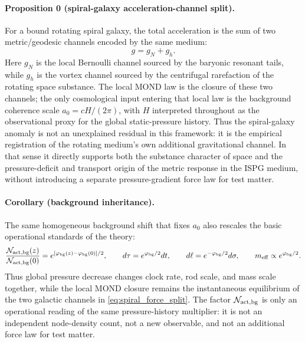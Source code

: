 \documentclass[11pt]{article}
\begin{document}
\paragraph{Proposition 0 (spiral-galaxy acceleration-channel split).}
For a bound rotating spiral galaxy, the total acceleration is the sum of
two metric/geodesic channels encoded by the same medium:
\begin{equation}
  g = g_N + g_h.
  \label{eq:spiral_force_split}
\end{equation}
Here $g_N$ is the local Bernoulli channel sourced by the baryonic
resonant tails, while $g_h$ is the vortex channel sourced by the
centrifugal rarefaction of the rotating space substance.  The local
MOND law is the closure of these two channels; the only cosmological
input entering that local law is the background coherence scale
$a_0=cH/(2\pi)$, with $H$ interpreted throughout as the observational
proxy for the global static-pressure history.
Thus the spiral-galaxy anomaly is not an unexplained residual in this
framework: it is the empirical registration of the rotating medium's
own additional gravitational channel.  In that sense it directly
supports both the substance character of space and the pressure-deficit
and transport origin of the metric response in the ISPG medium, without
introducing a separate pressure-gradient force law for test matter.

\paragraph{Corollary (background inheritance).}
The same homogeneous background shift that fixes $a_0$ also rescales the
basic operational standards of the theory:
\begin{equation}
  \frac{\mathcal N_{\rm act,bg}(z)}
       {\mathcal N_{\rm act,bg}(0)}
  = e^{[\phi_{\rm bg}(z)-\phi_{\rm bg}(0)]/2},
  \qquad
  d\tau = e^{\phi_{\rm bg}/2}dt,\qquad
  d\ell = e^{-\phi_{\rm bg}/2}d\sigma,\qquad
  m_{\rm eff}\propto e^{\phi_{\rm bg}/2}.
  \label{eq:bg_inheritance}
\end{equation}
Thus global pressure decrease changes clock rate, rod scale, and mass
scale together, while the local MOND closure remains the instantaneous
equilibrium of the two galactic channels in \eqref{eq:spiral_force_split}.
The factor $\mathcal N_{\rm act,bg}$ is only an operational reading of the
same pressure-history multiplier: it is not an independent node-density
count, not a new observable, and not an additional force law for test matter.
\end{document}
